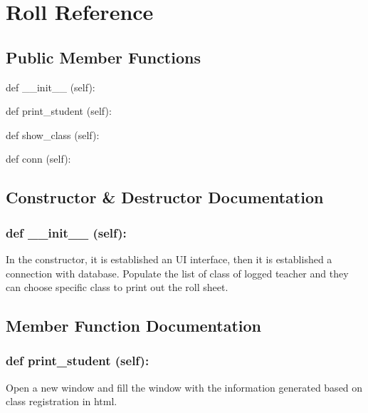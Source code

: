 \hypertarget{Roll}{\section{Roll Reference}
\label{Roll}
}
\subsection*{Public Member Functions}
\begin{DoxyCompactItemize}
\item 
def {\_\_init\_\_} (self):
\item 
def {print\_student} (self):
\item 
def {show\_class} (self):
\item 
def {conn} (self):


\end{DoxyCompactItemize}

\subsection{Constructor \& Destructor Documentation}
\hypertarget{class_poly_aa3def076b74bed67904976ad4f9fe9b1}{
\subsubsection[{def __init__ (self):}]{\setlength{\rightskip}{0pt plus 5cm}def {\_\_init\_\_} (self): 
}}
In the constructor, it is established an UI interface, then it is  established a connection with database. Populate the list of class of logged teacher and they can choose specific class to print out the roll sheet. 

\subsection{Member Function Documentation}
\hypertarget{class_poly_a14a7ad77ce612b0c54f531d307ee4b39}{
\subsubsection[{def print_student (self):}]{\setlength{\rightskip}{0pt plus 5cm}def {print\_student} (self):}}\label{class_poly_a14a7ad77ce612b0c54f531d307ee4b39}
Open a new window and fill the window with the information generated based on class registration in html.

